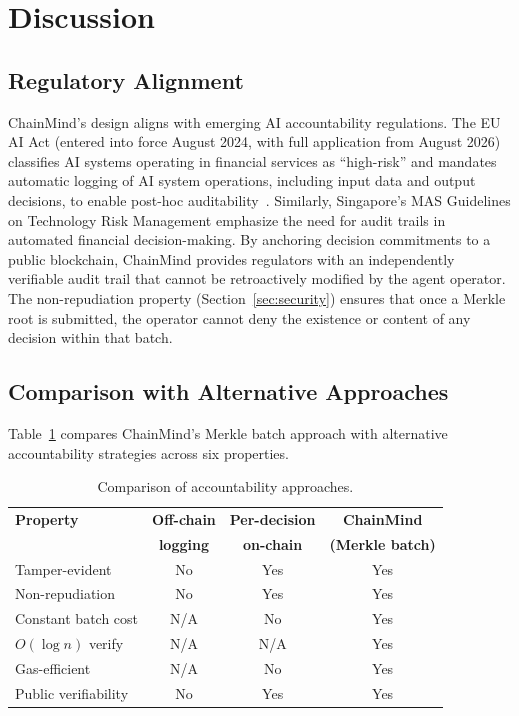 \documentclass[manuscript,nonacm]{acmart}
\begin{document}
\section{Discussion}
\label{sec:discussion}

\subsection{Regulatory Alignment}

ChainMind's design aligns with emerging AI accountability regulations.
The EU AI Act (entered into force August 2024, with full application from August 2026) classifies AI systems operating in financial services as ``high-risk'' and mandates automatic logging of AI system operations, including input data and output decisions, to enable post-hoc auditability~\cite{euaiact2024}.
Similarly, Singapore's MAS Guidelines on Technology Risk Management emphasize the need for audit trails in automated financial decision-making.
By anchoring decision commitments to a public blockchain, ChainMind provides regulators with an independently verifiable audit trail that cannot be retroactively modified by the agent operator.
The non-repudiation property (Section~\ref{sec:security}) ensures that once a Merkle root is submitted, the operator cannot deny the existence or content of any decision within that batch.

\subsection{Comparison with Alternative Approaches}

Table~\ref{tab:comparison} compares ChainMind's Merkle batch approach with alternative accountability strategies across six properties.

\begin{table}[t]
\centering
\caption{Comparison of accountability approaches.}
\label{tab:comparison}
\begin{tabular}{@{}lccc@{}}
\toprule
\textbf{Property} & \textbf{Off-chain} & \textbf{Per-decision} & \textbf{ChainMind} \\
 & \textbf{logging} & \textbf{on-chain} & \textbf{(Merkle batch)} \\
\midrule
Tamper-evident      & No  & Yes & Yes \\
Non-repudiation     & No  & Yes & Yes \\
Constant batch cost & N/A & No  & Yes \\
$O(\log n)$ verify  & N/A & N/A & Yes \\
Gas-efficient       & N/A & No  & Yes \\
Public verifiability & No & Yes & Yes \\
\bottomrule
\end{tabular}
\end{table}
\end{document}
